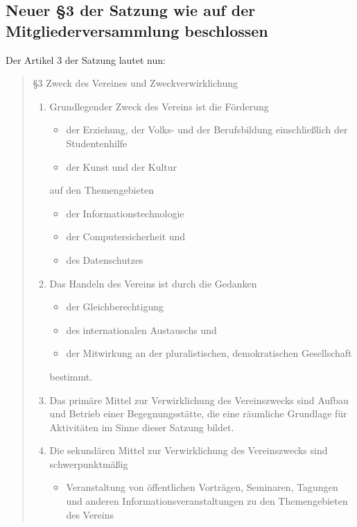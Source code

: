 \documentclass{scrartcl}
\begin{document}
\subsection{Neuer §3 der Satzung wie auf der Mitgliederversammlung beschlossen} 
\label{sec:new_para_3}
Der Artikel 3 der Satzung lautet nun:

\begin{quote}
	
	§3 Zweck des Vereines und Zweckverwirklichung
\begin{enumerate}
	\item Grundlegender Zweck des Vereins ist die Förderung
		\begin{itemize}
			\item der Erziehung, der Volks- und der Berufsbildung einschließlich
				  der Studentenhilfe
			\item der Kunst und der Kultur
		\end{itemize}
		auf den Themengebieten
		\begin{itemize}
			\item der Informationstechnologie
			\item der Computersicherheit und
			\item des Datenschutzes
		\end{itemize}

	\item Das Handeln des Vereins ist durch die Gedanken
		\begin{itemize}
			\item der Gleichberechtigung
			\item des internationalen Austauschs und
			\item der Mitwirkung an der pluralistischen, demokratischen
				Gesellschaft
		\end{itemize}
		bestimmt.

	\item Das primäre Mittel zur Verwirklichung des Vereinszwecks sind
		Aufbau und Betrieb einer Begegnungsstätte, die eine räumliche
		Grundlage für Aktivitäten im Sinne dieser Satzung bildet.

	\item Die sekundären Mittel zur Verwirklichung des Vereinszwecks sind
		schwerpunktmäßig

	\begin{itemize}
		\item Veranstaltung von öffentlichen Vorträgen, Seminaren, Tagungen und
			anderen Informationsveranstaltungen zu den Themengebieten
			des Vereins


\end{itemize}
\end{enumerate}
\end{quote}
\end{document}
